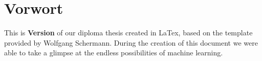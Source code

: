 \chapter{Vorwort}


This is \textbf{Version \htldiplDate} of our diploma thesis created in LaTex, based on the template provided by Wolfgang Schermann.
During the creation of this document we were able to take a glimpse at the endless possibilities of machine learning.


